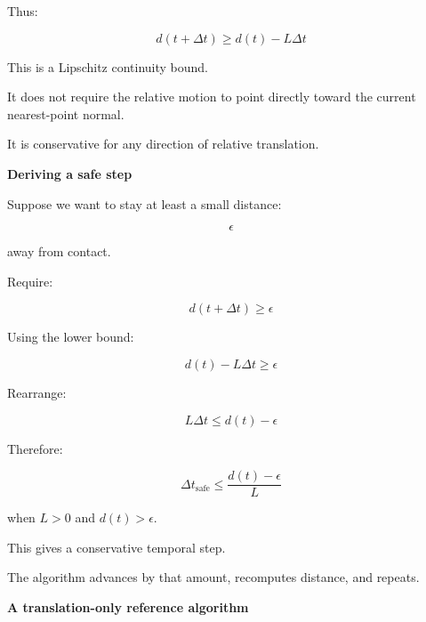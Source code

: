 Thus:

\[
\boxed{ d(t+\Delta t)\ge d(t)-L\Delta t }
\]

This is a Lipschitz continuity bound.

It does not require the relative motion to point directly toward the current nearest-point normal.

It is conservative for any direction of relative translation.

\textbf{Deriving a safe step}

Suppose we want to stay at least a small distance:

\[
\epsilon
\]

away from contact.

Require:

\[
d(t+\Delta t)\ge\epsilon
\]

Using the lower bound:

\[
d(t)-L\Delta t\ge\epsilon
\]

Rearrange:

\[
L\Delta t\le d(t)-\epsilon
\]

Therefore:

\[
\boxed{ \Delta t_{\mathrm{safe}} \le \frac{d(t)-\epsilon}{L} }
\]

when \(L>0\) and \(d(t)>\epsilon\).

This gives a conservative temporal step.

The algorithm advances by that amount, recomputes distance, and repeats.

\textbf{A translation-only reference algorithm}

